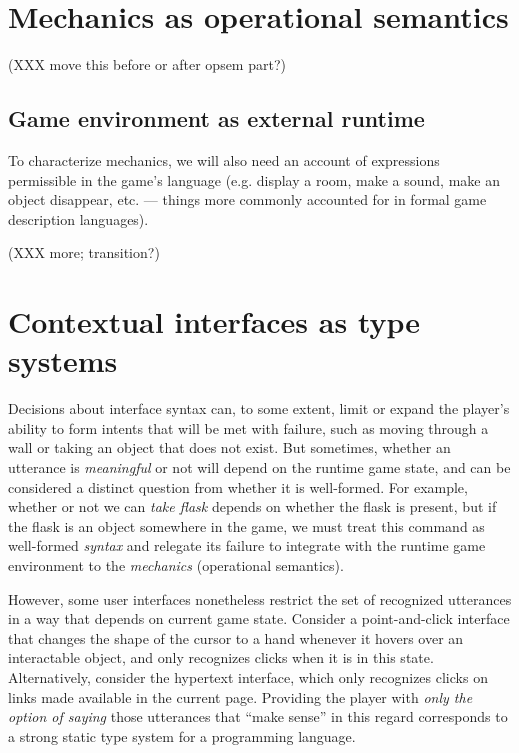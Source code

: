  \section{Mechanics as operational semantics}
  \label{sec:opsem}

  (XXX move this before or after opsem part?)
  \subsection{Game environment as external runtime}

  To characterize mechanics, we will also need an account of expressions
  permissible in the game's language (e.g. display a room, make a sound,
  make an object disappear, etc. --- things more commonly accounted for in
  formal game description languages). 

  (XXX more; transition?)
% 

  

  \section{Contextual interfaces as type systems}
  \label{sec:typesys}

  Decisions about interface syntax can, to some extent, limit or expand the
  player's ability to form intents that will be met with failure, such as
  moving through a wall or taking an object that does not exist. But
  sometimes, whether an utterance is {\em meaningful} or not will depend on
  the runtime game state, and can be considered a distinct question from whether it is
  well-formed. For example, whether or not we can {\em take
  flask} depends on whether the flask is present, but if the flask is an
  object somewhere in the game, we must treat this command as well-formed {\em
  syntax} and relegate its failure to integrate with the runtime game
  environment to the {\em mechanics} (operational semantics).

  However, some user interfaces nonetheless restrict the set of recognized
  utterances in a way that depends on current game state. Consider a
  point-and-click interface that changes the shape of the cursor to a hand
  whenever it hovers over an interactable object, and only recognizes
  clicks when it is in this state. Alternatively, consider the hypertext
  interface, which only recognizes clicks on links made available in the
  current page.  Providing the player with {\em only the option of saying}
  those utterances that ``make sense'' in this regard corresponds to a
  strong static type system for a programming language.

